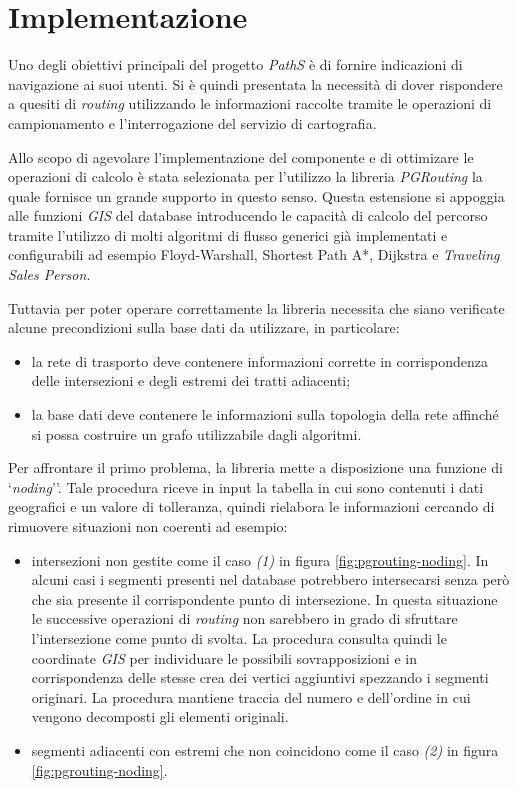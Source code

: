 \section{Implementazione}
Uno degli obiettivi principali del progetto \emph{PathS} è di fornire indicazioni di navigazione ai suoi utenti. Si è quindi presentata la necessità di dover rispondere a quesiti di \emph{routing} utilizzando le informazioni raccolte tramite le operazioni di campionamento e l'interrogazione del servizio di cartografia. 

Allo scopo di agevolare l'implementazione del componente e di ottimizare le operazioni di calcolo è stata selezionata per l'utilizzo la libreria \emph{PGRouting} la quale fornisce un grande supporto in questo senso. Questa estensione si appoggia alle funzioni \emph{GIS} del database introducendo le capacità di calcolo del percorso tramite l'utilizzo di molti algoritmi di flusso generici già implementati e configurabili ad esempio Floyd-Warshall, Shortest Path A*, Dijkstra e \emph{Traveling Sales Person}.

Tuttavia per poter operare correttamente la libreria necessita che siano  verificate alcune precondizioni sulla base dati da utilizzare, in particolare:
\begin{itemize}
	\item la rete di trasporto deve contenere informazioni corrette in corrispondenza delle intersezioni e degli estremi dei tratti adiacenti;
	\item la base dati deve contenere le informazioni sulla topologia della rete affinché si possa costruire un grafo utilizzabile dagli algoritmi.
\end{itemize}

Per affrontare il primo problema, la libreria mette a disposizione una funzione di `\emph{noding}''. Tale procedura riceve in input la tabella in cui sono contenuti i dati geografici e un valore di tolleranza, quindi rielabora le informazioni cercando di rimuovere situazioni non coerenti ad esempio:
\begin{itemize}
 \item intersezioni non gestite come il caso \emph{(1)} in figura \ref{fig:pgrouting-noding}. In alcuni casi i segmenti presenti nel database potrebbero intersecarsi senza però che sia presente il corrispondente punto di intersezione. In questa situazione le successive operazioni di \emph{routing} non sarebbero in grado di sfruttare l'intersezione come punto di svolta. La procedura consulta quindi le coordinate \emph{GIS} per individuare le possibili sovrapposizioni e in corrispondenza delle stesse crea dei vertici aggiuntivi spezzando i segmenti originari. La procedura mantiene traccia del numero e dell'ordine in cui vengono decomposti gli elementi originali.
 \item segmenti adiacenti con estremi che non coincidono come il caso \emph{(2)} in figura \ref{fig:pgrouting-noding}.
\end{itemize}

